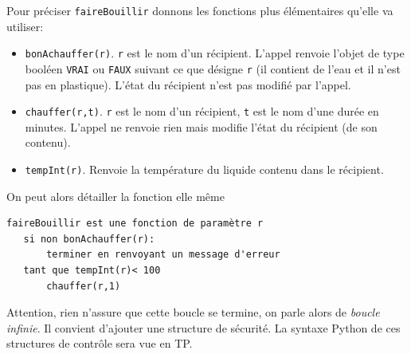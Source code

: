 Pour préciser \verb|faireBouillir| donnons les fonctions plus élémentaires qu'elle va utiliser:
\begin{itemize}
 \item \verb|bonAchauffer(r)|.  \verb|r| est le nom d'un récipient. L'appel renvoie l'objet de type booléen \verb|VRAI| ou \verb|FAUX| suivant ce que désigne \verb|r| (il contient de l'eau et il n'est pas en plastique). L'état du récipient n'est pas modifié par l'appel.
 \item \verb|chauffer(r,t)|.  \verb|r| est le nom d'un récipient, \verb|t| est le nom d'une durée en minutes.  L'appel ne renvoie rien mais modifie l'état du récipient (de son contenu).
 \item \verb|tempInt(r)|. Renvoie la température du liquide contenu dans le récipient.
\end{itemize}
On peut alors détailler la fonction elle même
\begin{verbatim}
faireBouillir est une fonction de paramètre r
   si non bonAchauffer(r):
       terminer en renvoyant un message d'erreur
   tant que tempInt(r)< 100
       chauffer(r,1)
\end{verbatim}
Attention, rien n'assure que cette boucle se termine, on parle alors de \emph{boucle infinie}. Il convient d'ajouter une structure de sécurité.
La syntaxe Python de ces structures de contrôle sera vue en TP.

